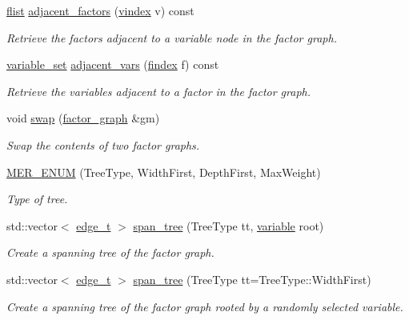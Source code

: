 \begin{DoxyCompactItemize}
\hyperlink{classmerlin_1_1factor__graph_a48dec4ea8a655315053984a81fe93ebc}{flist} \hyperlink{classmerlin_1_1factor__graph_acad131cfcb6750093683128ab7171523}{adjacent\+\_\+factors} (\hyperlink{classmerlin_1_1factor__graph_a6b8a8220d86d6a6f91a8d2c7dd00ddc9}{vindex} v) const 
\begin{DoxyCompactList}\small\item\em Retrieve the factors adjacent to a variable node in the factor graph. \end{DoxyCompactList}\item 
\hyperlink{classmerlin_1_1variable__set}{variable\+\_\+set} \hyperlink{classmerlin_1_1factor__graph_a84f3800e16143f385dd14afedd7d49ef}{adjacent\+\_\+vars} (\hyperlink{classmerlin_1_1factor__graph_a533556bd4ec6961b63a91a80a8a37508}{findex} f) const 
\begin{DoxyCompactList}\small\item\em Retrieve the variables adjacent to a factor in the factor graph. \end{DoxyCompactList}\item 
void \hyperlink{classmerlin_1_1factor__graph_a5cdf18711449fed75507d80bbfe549fb}{swap} (\hyperlink{classmerlin_1_1factor__graph}{factor\+\_\+graph} \&gm)
\begin{DoxyCompactList}\small\item\em Swap the contents of two factor graphs. \end{DoxyCompactList}\item 
\hypertarget{classmerlin_1_1factor__graph_ae9d805687c0de6a98a423b12987d0847}{}\hyperlink{classmerlin_1_1factor__graph_ae9d805687c0de6a98a423b12987d0847}{M\+E\+R\+\_\+\+E\+N\+U\+M} (Tree\+Type, Width\+First, Depth\+First, Max\+Weight)\label{classmerlin_1_1factor__graph_ae9d805687c0de6a98a423b12987d0847}

\begin{DoxyCompactList}\small\item\em Type of tree. \end{DoxyCompactList}\item 
std\+::vector$<$ \hyperlink{namespacemerlin_a44eb24328668c9618f20915763bd3192}{edge\+\_\+t} $>$ \hyperlink{classmerlin_1_1factor__graph_a15aa43072a0d40884957b7053106d5fb}{span\+\_\+tree} (Tree\+Type tt, \hyperlink{classmerlin_1_1variable}{variable} root)
\begin{DoxyCompactList}\small\item\em Create a spanning tree of the factor graph. \end{DoxyCompactList}\item 
std\+::vector$<$ \hyperlink{namespacemerlin_a44eb24328668c9618f20915763bd3192}{edge\+\_\+t} $>$ \hyperlink{classmerlin_1_1factor__graph_add951d3edd3613808615b87fa2201904}{span\+\_\+tree} (Tree\+Type tt=Tree\+Type\+::\+Width\+First)
\begin{DoxyCompactList}\small\item\em Create a spanning tree of the factor graph rooted by a randomly selected variable. \end{DoxyCompactList}\end{DoxyCompactItemize}
